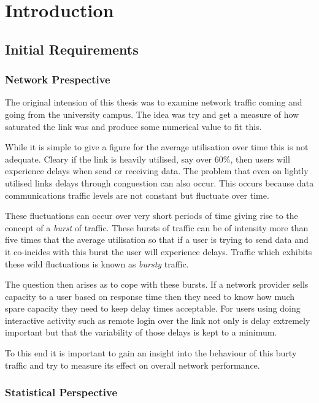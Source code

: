 \chapter{Introduction}

\section{Initial Requirements}

\subsection{Network Prespective}

The original intension of this thesis was to examine network traffic
coming and going from the university campus.  The idea was try and get
a measure of how saturated the link was and produce some numerical
value to fit this.

While it is simple to give a figure for the average utilisation over
time this is not adequate.  Cleary if the link is heavily utilised,
say over 60\%, then users will experience delays when send or
receiving data.  The problem that even on lightly utilised links
delays through conguestion can also occur.  This occurs because
data communications traffic levels are not constant but fluctuate over
time.

These fluctuations can occur over very short periods of time giving
rise to the concept of a {\em burst} of traffic.  These bursts of
traffic can be of intensity more than five times that the average
utilisation so that if a user is trying to send data and it co-incides
with this burst the user will experience delays.  Traffic which
exhibits these wild fluctuations is known as {\em bursty} traffic.

The question then arises as to cope with these bursts.  If a network
provider sells capacity to a user based on response time then they
need to know how much spare capacity they need to keep delay times
acceptable.  For users using doing interactive activity such as remote
login over the link not only is delay extremely important but that the
variability of those delays is kept to a minimum.

To this end it is important to gain an insight into the behaviour of
this burty traffic and try to measure its effect on overall network
performance.

\subsection{Statistical Perspective}

